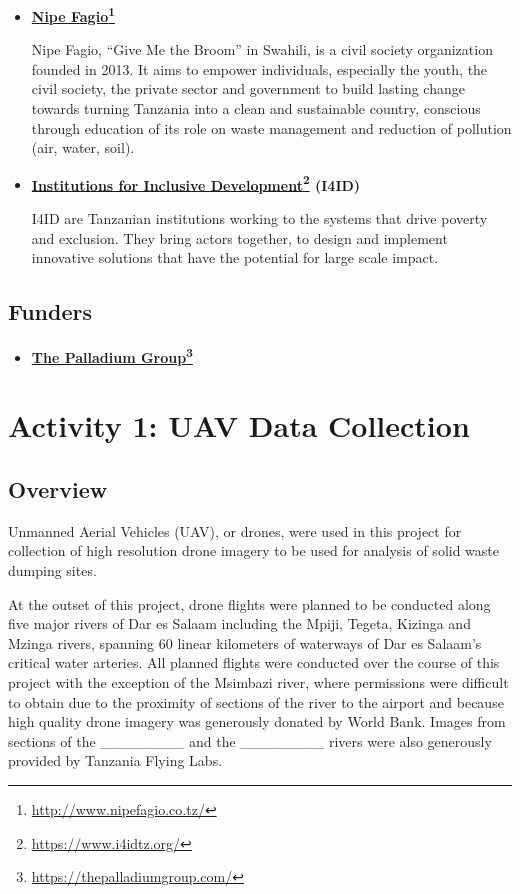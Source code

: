 \documentclass[a4paper,12pt,twoside]{article}
\begin{document}
    \begin{itemize}
        \item \textbf{\href{http://www.nipefagio.co.tz/}{Nipe Fagio}\footnote{\url{http://www.nipefagio.co.tz/}}}
    
        Nipe Fagio, “Give Me the Broom” in Swahili, is a civil society organization founded in 2013. It aims to empower individuals, especially the youth, the civil society, the private sector and government to build lasting change towards turning Tanzania into a clean and sustainable country, conscious through education of its role on waste management and reduction of pollution (air, water, soil).
        
        \item \textbf{\href{https://www.i4idtz.org/}{Institutions for Inclusive Development}\footnote{\url{https://www.i4idtz.org/}} (I4ID)}
    
        I4ID are Tanzanian institutions working to the systems that drive poverty and exclusion. They bring actors together, to design and implement innovative solutions that have the potential for large scale impact.
    
    \end{itemize}

\subsection{Funders}

    \begin{itemize}
        \item \textbf{\href{https://thepalladiumgroup.com/}{The Palladium Group}\footnote{\url{https://thepalladiumgroup.com/}}}
        
        \lipsum[0-1]
    \end{itemize}   

\section{Activity 1: UAV Data Collection}

\subsection{Overview}
    Unmanned Aerial Vehicles (UAV), or drones, were used in this project for collection of high resolution drone imagery to be used for analysis of solid waste dumping sites.
    
    At the outset of this project, drone flights were planned to be  conducted along five major rivers of Dar es Salaam including the Mpiji, Tegeta, Kizinga and Mzinga rivers, spanning 60 linear kilometers of waterways of Dar es Salaam’s critical water arteries. All planned flights were conducted over the course of this project with the exception of the Msimbazi river, where permissions were difficult to obtain due to the proximity of sections of the river to the airport and because high quality drone imagery was generously donated by World Bank. Images from sections of the ________ and the ________ rivers were also generously provided by Tanzania Flying Labs.
    
\end{document}
